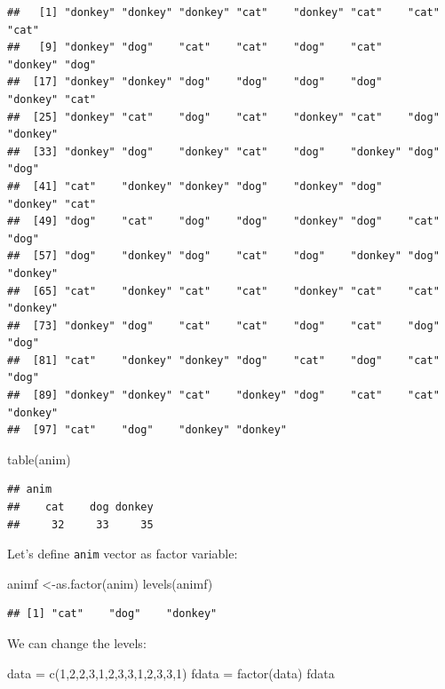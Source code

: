 \documentclass[
]{book}
\newenvironment{Shaded}{\begin{snugshade}}{\end{snugshade}}
\newcommand{\DecValTok}[1]{\textcolor[rgb]{0.00,0.00,0.81}{#1}}
\newcommand{\FunctionTok}[1]{\textcolor[rgb]{0.00,0.00,0.00}{#1}}
\newcommand{\NormalTok}[1]{#1}
\newcommand{\OtherTok}[1]{\textcolor[rgb]{0.56,0.35,0.01}{#1}}
\begin{document}
\begin{verbatim}
##   [1] "donkey" "donkey" "donkey" "cat"    "donkey" "cat"    "cat"    "cat"   
##   [9] "donkey" "dog"    "cat"    "cat"    "dog"    "cat"    "donkey" "dog"   
##  [17] "donkey" "donkey" "dog"    "dog"    "dog"    "dog"    "donkey" "cat"   
##  [25] "donkey" "cat"    "dog"    "cat"    "donkey" "cat"    "dog"    "donkey"
##  [33] "donkey" "dog"    "donkey" "cat"    "dog"    "donkey" "dog"    "dog"   
##  [41] "cat"    "donkey" "donkey" "dog"    "donkey" "dog"    "donkey" "cat"   
##  [49] "dog"    "cat"    "dog"    "dog"    "donkey" "dog"    "cat"    "dog"   
##  [57] "dog"    "donkey" "dog"    "cat"    "dog"    "donkey" "dog"    "donkey"
##  [65] "cat"    "donkey" "cat"    "cat"    "donkey" "cat"    "cat"    "donkey"
##  [73] "donkey" "dog"    "cat"    "cat"    "dog"    "cat"    "dog"    "dog"   
##  [81] "cat"    "donkey" "donkey" "dog"    "cat"    "dog"    "cat"    "dog"   
##  [89] "donkey" "donkey" "cat"    "donkey" "dog"    "cat"    "cat"    "donkey"
##  [97] "cat"    "dog"    "donkey" "donkey"
\end{verbatim}

\begin{Shaded}
\begin{Highlighting}[]
\FunctionTok{table}\NormalTok{(anim)}
\end{Highlighting}
\end{Shaded}

\begin{verbatim}
## anim
##    cat    dog donkey 
##     32     33     35
\end{verbatim}

Let's define \texttt{anim} vector as factor variable:

\begin{Shaded}
\begin{Highlighting}[]
\NormalTok{animf }\OtherTok{\textless{}{-}}\FunctionTok{as.factor}\NormalTok{(anim)}
\FunctionTok{levels}\NormalTok{(animf)}
\end{Highlighting}
\end{Shaded}

\begin{verbatim}
## [1] "cat"    "dog"    "donkey"
\end{verbatim}

We can change the levels:

\begin{Shaded}
\begin{Highlighting}[]
\NormalTok{data }\OtherTok{=} \FunctionTok{c}\NormalTok{(}\DecValTok{1}\NormalTok{,}\DecValTok{2}\NormalTok{,}\DecValTok{2}\NormalTok{,}\DecValTok{3}\NormalTok{,}\DecValTok{1}\NormalTok{,}\DecValTok{2}\NormalTok{,}\DecValTok{3}\NormalTok{,}\DecValTok{3}\NormalTok{,}\DecValTok{1}\NormalTok{,}\DecValTok{2}\NormalTok{,}\DecValTok{3}\NormalTok{,}\DecValTok{3}\NormalTok{,}\DecValTok{1}\NormalTok{)}
\NormalTok{fdata }\OtherTok{=} \FunctionTok{factor}\NormalTok{(data)}
\NormalTok{fdata}
\end{Highlighting}
\end{Shaded}
\end{document}
